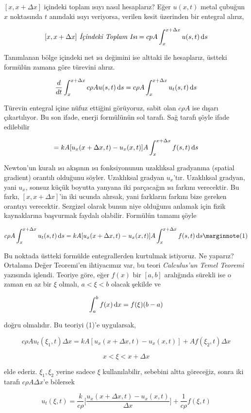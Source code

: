 \documentclass[12pt,fleqn]{article}\usepackage{../../common}
\begin{document}
$[x,x+\Delta x]$ içindeki toplam ısıyı nasıl hesaplarız? Eğer $u(x,t)$
metal çubuğun $x$ noktasında $t$ anındaki ısıyı veriyorsa, verilen kesit
üzerinden bir entegral alırız,

$$
[x,x+\Delta x] \textit{ İçindeki Toplam Isı} = 
cpA \int_{ x}^{x+\Delta x}u(s,t) \,\mathrm{d} s
$$

Tanımlanan bölge içindeki net ısı değimini ise alttaki ile hesaplarız,
üstteki formülün zamana göre türevini alırız. 

$$
\frac{d}{dt} \int_{ x}^{x+\Delta x} c\rho A u(s,t) \,\mathrm{d} s = 
c\rho A  \int_{ x}^{x+\Delta x} u_t(s,t) \,\mathrm{d} s
$$

Türevin entegral içine nüfuz ettiğini görüyoruz, sabit olan $c\rho A$ ise
dışarı çıkartılıyor. Bu son ifade, enerji formülünün sol tarafı. Sağ tarafı
şöyle ifade edilebilir

$$ = kA [ u_x(x+\Delta x,t) - u_x(x,t)] A \int_{x}^{x+\Delta x} f(s,t) \,\mathrm{d} s $$

Newton'un kuralı ısı akışının ısı fonksiyonunun uzaklıksal gradyanına
(spatial gradient) orantılı olduğunu söyler. Uzaklıksal gradyan
$u_x$'tır. Uzaklıksal gradyan, yani $u_x$, sonsuz küçük boyutta yanyana iki
parçacağın ısı farkını verecektir. Bu farkı, $[x,x+\Delta x]$'in iki ucunda
alırsak, yani farkların farkını bize gereken orantıyı verecektir. Sezgizel
olarak bunun niye olduğunu anlamak için fizik kaynaklarına başvurmak
faydalı olabilir. Formülün tamamı şöyle

$$
c\rho A  \int_{ x}^{x+\Delta x} u_t(s,t) \ud s =
kA [ u_x(x+\Delta x,t) - u_x(x,t)] A \int_{x}^{x+\Delta x} f(s,t) \ud s 
\mlabel{1}
$$

Bu noktada üstteki formülde entegrallerden kurtulmak istiyoruz. Ne
yaparız?  Ortalama Değer Teoremi'en ihtiyacımız var, bu teori {\em
  Calculus'un Temel Teoremi} yazısında işlendi. Teoriye göre, eğer $f(x)$
bir $[a,b]$ aralığında sürekli ise o zaman en az bir $\xi$ olmalı, $a <
\xi < b$ olacak şekilde ve

$$ \int_{ a}^{b} f(x) \,\mathrm{d} x = f(\xi)(b-a)  $$

doğru olmalıdır. Bu teoriyi (1)'e uygularsak,

$$ c\rho A u_t(\xi_1,t)\Delta x = 
kA[u_x(x+\Delta x, t) - u_x(x,t)] + 
Af(\xi_2,t)\Delta x
 $$

$$ x < \xi < x+\Delta x $$

elde ederiz. $\xi_1,\xi_2$ yerine sadece $\xi$ kullanılabilir, sebebini
altta göreceğiz, sonra iki tarafı $c\rho A \Delta x$'e bölersek


$$
u_t(\xi,t) =  \frac{k}{c\rho}
\bigg[
\frac{u_x(x+\Delta x,t) - u_x(x,t)} {\Delta x}
\bigg]
+ \frac{ 1}{c\rho}f(\xi,t)
$$
\end{document}
